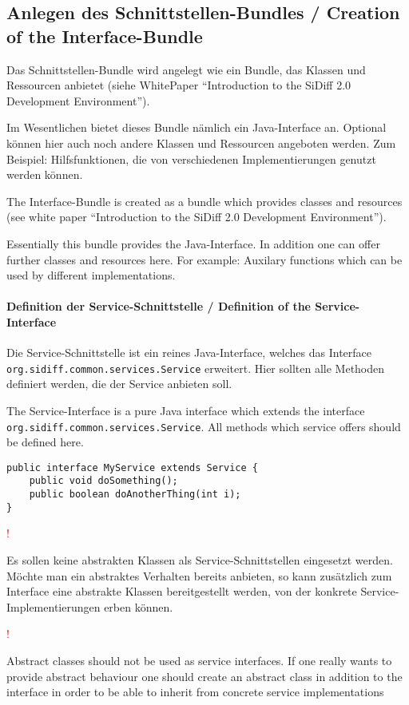 \documentclass[10pt,a4paper]{scrartcl}
\newcommand{\hinweis}[1]{
\begin{framed}
\begin{minipage}[t]{0.02\textwidth}
\textcolor{red}{\Huge{\sffamily !}}
\end{minipage}
\begin{minipage}[t]{0.94\textwidth}
#1
\end{minipage}
\end{framed}
}
\providecommand{\deng}[2]{#1 / {\sffamily #2}}
\providecommand{\deutsch}[1]{#1}
\providecommand{\englisch}[1]{{\sffamily #1}}
\begin{document}
\subsection{\deng{Anlegen des Schnittstellen-Bundles}{Creation of the Interface-Bundle}}
\deutsch{Das Schnittstellen-Bundle wird angelegt wie ein Bundle, das Klassen und 
Ressourcen anbietet (siehe WhitePaper ``Introduction to the SiDiff 2.0 Development Environment'').

Im Wesentlichen bietet dieses Bundle nämlich ein Java-Interface an. 
Optional können hier auch noch andere Klassen
und Ressourcen angeboten werden. Zum Beispiel: Hilfsfunktionen, die von 
verschiedenen Implementierungen genutzt werden können.}

\englisch{The Interface-Bundle is created as a bundle which provides classes and
resources (see white paper ``Introduction to the SiDiff 2.0 Development
Environment'').

Essentially this bundle provides the Java-Interface.  In addition one can offer
further classes and resources here. For example: Auxilary functions which can be
used by different implementations.} 

\paragraph{\deng{Definition der Service-Schnittstelle}{Definition of the Service-Interface}}
\deutsch{Die Service-Schnittstelle ist ein reines Java-Interface, welches das
Interface \texttt{org.sidiff.common.services.Service} erweitert. Hier sollten
alle Methoden definiert werden, die der Service anbieten soll.}

\englisch{The Service-Interface is a pure Java interface which extends the
interface \texttt{org.sidiff.common.services.Service}. All methods which service
offers should be defined here.}

\begin{lstlisting}
public interface MyService extends Service {
	public void doSomething();
	public boolean doAnotherThing(int i);
}
\end{lstlisting}

\deutsch{\hinweis{Es sollen keine abstrakten Klassen als Service-Schnittstellen
eingesetzt werden. Möchte man ein abstraktes Verhalten bereits anbieten, so kann
zusätzlich zum Interface eine abstrakte Klassen bereitgestellt werden, von der
konkrete Service-Implementierungen erben können.}}

\englisch{\hinweis{Abstract classes should not be used as service interfaces. If
one really wants to provide abstract behaviour one should create an abstract
class in addition to the interface in order to be able to inherit from concrete
service implementations}}
\end{document}
